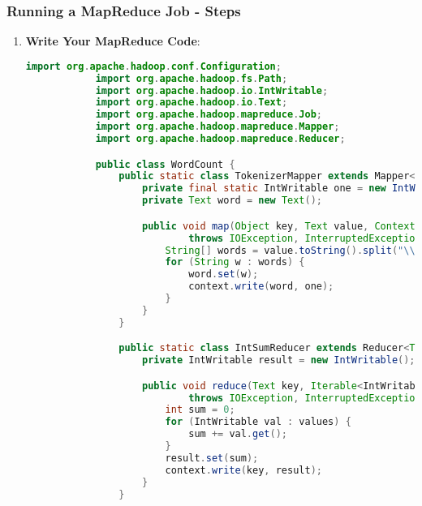 \documentclass[aspectratio=169]{beamer}
\begin{document}
\begin{frame}[fragile]
    \frametitle{Running a MapReduce Job - Steps}
    \begin{enumerate}
        \item \textbf{Write Your MapReduce Code}:
            \begin{lstlisting}[language=Java]
            import org.apache.hadoop.conf.Configuration;
            import org.apache.hadoop.fs.Path;
            import org.apache.hadoop.io.IntWritable;
            import org.apache.hadoop.io.Text;
            import org.apache.hadoop.mapreduce.Job;
            import org.apache.hadoop.mapreduce.Mapper;
            import org.apache.hadoop.mapreduce.Reducer;

            public class WordCount {
                public static class TokenizerMapper extends Mapper<Object, Text, Text, IntWritable> {
                    private final static IntWritable one = new IntWritable(1);
                    private Text word = new Text();

                    public void map(Object key, Text value, Context context) 
                            throws IOException, InterruptedException {
                        String[] words = value.toString().split("\\s+");
                        for (String w : words) {
                            word.set(w);
                            context.write(word, one);
                        }
                    }
                }

                public static class IntSumReducer extends Reducer<Text, IntWritable, Text, IntWritable> {
                    private IntWritable result = new IntWritable();

                    public void reduce(Text key, Iterable<IntWritable> values, Context context) 
                            throws IOException, InterruptedException {
                        int sum = 0;
                        for (IntWritable val : values) {
                            sum += val.get();
                        }
                        result.set(sum);
                        context.write(key, result);
                    }
                }


\end{lstlisting}
\end{enumerate}
\end{frame}
\end{document}
